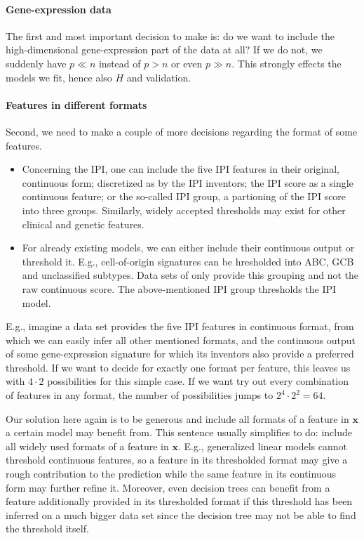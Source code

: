 \paragraph{Gene-expression data}
The first and most important decision to make is: do we want to include the high-dimensional
gene-expression part of the data at all? If we do not, we suddenly have $p \ll n$ instead of 
$p > n$ or even $p \gg n$. This strongly effects the models we fit, hence also $H$ and 
validation.

\paragraph{Features in different formats}
Second, we need to make a couple of more decisions regarding the format of some features.
\begin{itemize}
    \item Concerning the IPI, one can include the five IPI features in their original, continuous 
        form; discretized as by the IPI inventors; the IPI score as a single continuous feature; 
        or the so-called IPI group, a partioning of the IPI score into three groups. Similarly, 
        widely accepted thresholds may exist for other clinical and genetic features.
    \item For already existing models, we can either include their continuous output or threshold 
        it. E.g., cell-of-origin signatures can be hresholded into ABC, GCB and unclassified 
        subtypes. Data sets of only provide this grouping and not the raw continuous score. The 
        above-mentioned IPI group thresholds the IPI model. 
\end{itemize}

E.g., imagine a data set provides the five IPI features in continuous format, from which we can 
easily infer all other mentioned formats, and the continuous output of some gene-expression 
signature for which its inventors also provide a preferred threshold. If we want to decide for 
exactly one format per feature, this leaves us with $4 \cdot 2$ possibilities for this simple case. 
If we want try out every combination of features in any format, the number of possibilities jumps to 
$2^4 \cdot 2^2 = 64$. 

Our solution here again is to be generous and include all formats of a feature in $\mathbf{x}$ a 
certain model may benefit from. This sentence usually 
simplifies to do: include all widely used formats of a feature in $\mathbf{x}$. E.g., generalized 
linear models cannot threshold continuous features, so a feature in its thresholded format may give 
a rough contribution to the prediction while the same feature in its continuous form may further 
refine it. Moreover, even decision trees can benefit from a feature additionally provided in its 
thresholded format if this threshold has been inferred on a much bigger data set since the decision 
tree may not be able to find the threshold itself.

